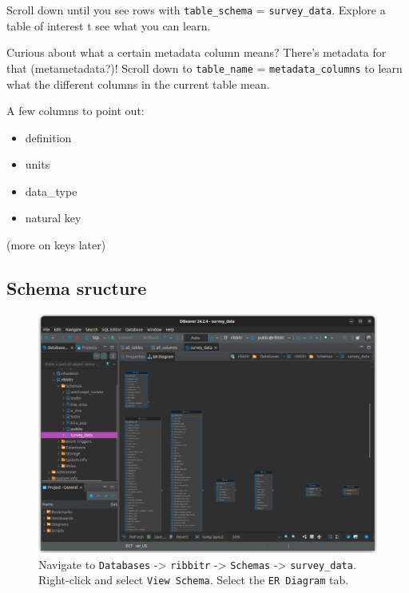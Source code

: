 \documentclass[
  letterpaper,
  DIV=11,
  numbers=noendperiod]{scrartcl}
\providecommand{\tightlist}{%
  \setlength{\itemsep}{0pt}\setlength{\parskip}{0pt}}\usepackage{longtable,booktabs,array}
\begin{document}
Scroll down until you see rows with \texttt{table\_schema} =
\texttt{survey\_data}. Explore a table of interest t see what you can
learn.

Curious about what a certain metadata column means? There's metadata for
that (metametadata?)! Scroll down to \texttt{table\_name} =
\texttt{metadata\_columns} to learn what the different columns in the
current table mean.

A few columns to point out:

\begin{itemize}
\tightlist
\item
  definition
\item
  units
\item
  data\_type
\item
  natural key
\end{itemize}

(more on keys later)

\subsection{Schema sructure}\label{schema-sructure}

\begin{figure}[H]

{\centering \includegraphics{images/DBeaver_data_discovery_04.png}

}

\caption{Navigate to \texttt{Databases} -\textgreater{} \texttt{ribbitr}
-\textgreater{} \texttt{Schemas} -\textgreater{} \texttt{survey\_data}.
Right-click and select \texttt{View\ Schema}. Select the
\texttt{ER\ Diagram} tab.}

\end{figure}%
\end{document}
